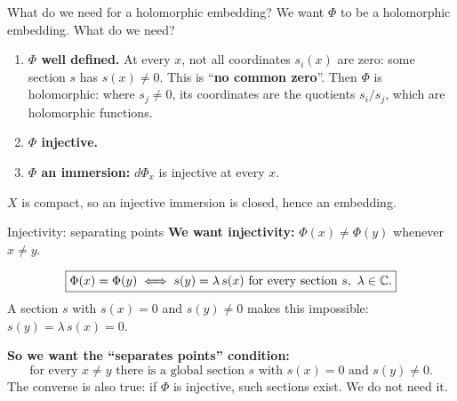 \begin{frame}{What do we need for a holomorphic embedding?}
\label{fr:goal-sections}
We want \(\Phi\) to be a holomorphic embedding. What do we need?
\begin{enumerate}
\setlength{\itemsep}{10pt}
\item \textbf{\(\Phi\) well defined.} At every \(x\), not all coordinates \(s_i(x)\) are zero: some section \(s\) has \(s(x)\ne0\). This is ``\textbf{no common zero}''. Then \(\Phi\) is holomorphic: where \(s_j\ne0\), its coordinates are the quotients \(s_i/s_j\), which are holomorphic functions.
\item \textbf{\(\Phi\) injective.}
\item \textbf{\(\Phi\) an immersion:} \(d\Phi_x\) is injective at every \(x\).
\end{enumerate}
\par\medskip
\(X\) is compact, so an injective immersion is closed, hence an embedding.
\end{frame}


\begin{frame}{Injectivity: separating points}
\label{fr:prov-injective}
\textbf{We want injectivity:} \(\Phi(x)\ne\Phi(y)\) whenever \(x\ne y\).
\par\bigskip
\[
\boxed{\Phi(x)=\Phi(y)\iff s(y)=\lambda\,s(x)\text{ for every section }s,\ \lambda\in\mathbb C.}
\]
A section \(s\) with \(s(x)=0\) and \(s(y)\ne0\) makes this impossible: \(s(y)=\lambda\,s(x)=0\).
\par\bigskip
\textbf{So we want the ``separates points'' condition:}
\[
\boxed{\text{for every } x\ne y \text{ there is a global section } s \text{ with } s(x)=0 \text{ and } s(y)\ne0.}
\]
The converse is also true: if \(\Phi\) is injective, such sections exist. We do not need it.
\end{frame}





